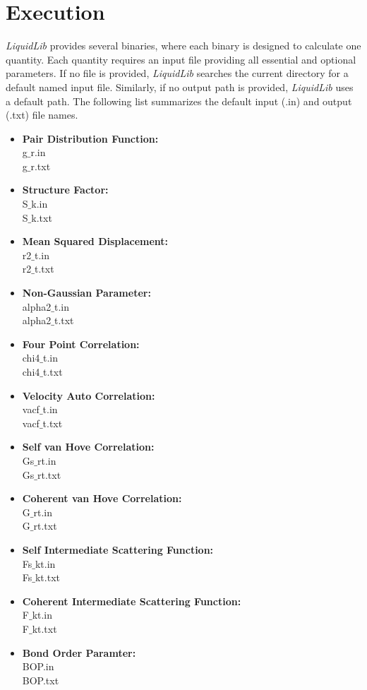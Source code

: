 \documentclass{article}
\begin{document}
\section{Execution}
\textit{LiquidLib} provides several binaries, where each binary is designed to calculate one quantity. Each quantity requires an input file providing all essential and optional parameters.  If no file is provided, \textit{LiquidLib} searches the current directory for a default named input file.  Similarly, if no output path is provided, \textit{LiquidLib} uses a default path.  The following list summarizes the default input (.in) and output (.txt) file names.
\begin{multicols}{2} \label{input_output}
\begin{itemize}
\item \textbf{Pair Distribution Function:}
 \\g$\_$r.in
 \\g$\_$r.txt
\item \textbf{Structure Factor:}
 \\S$\_$k.in
 \\S$\_$k.txt
\item \textbf{Mean Squared Displacement:}
 \\r2$\_$t.in
 \\r2$\_$t.txt
\item \textbf{Non-Gaussian Parameter:}
 \\alpha2$\_$t.in
 \\alpha2$\_$t.txt
 \item \textbf{Four Point Correlation:}
 \\chi4$\_$t.in
 \\chi4$\_$t.txt
 \item \textbf{Velocity Auto Correlation:}
 \\vacf$\_$t.in
 \\vacf$\_$t.txt
  \item \textbf{Self van Hove Correlation:}
 \\Gs$\_$rt.in
 \\Gs$\_$rt.txt
 \item \textbf{Coherent van Hove Correlation:}
 \\G$\_$rt.in
 \\G$\_$rt.txt
\item \textbf{Self Intermediate Scattering Function:}
 \\Fs$\_$kt.in
 \\Fs$\_$kt.txt
\item \textbf{Coherent Intermediate Scattering Function:}
\\F$\_$kt.in
\\F$\_$kt.txt
\item \textbf{Bond Order Paramter:}
\\BOP.in
\\BOP.txt
\end{itemize}
\end{multicols}
\end{document}
